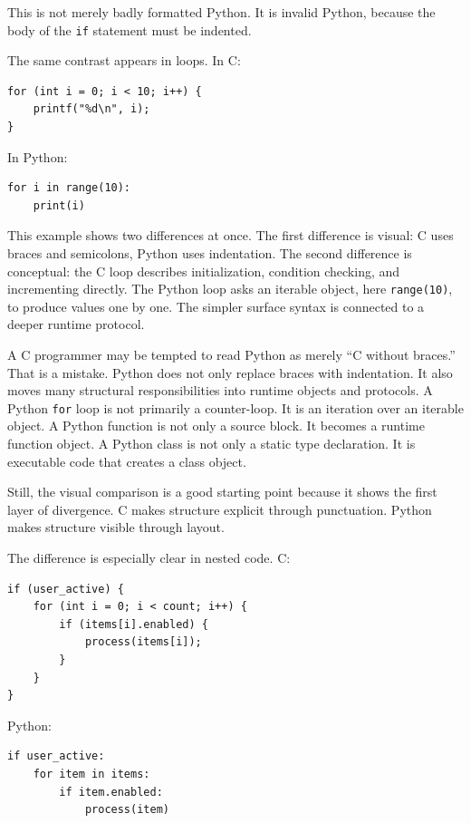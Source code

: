 This is not merely badly formatted Python. It is invalid Python, because the body of the \texttt{if} statement must be indented.

The same contrast appears in loops. In C:

\begin{verbatim}
for (int i = 0; i < 10; i++) {
    printf("%d\n", i);
}
\end{verbatim}

In Python:

\begin{verbatim}
for i in range(10):
    print(i)
\end{verbatim}

This example shows two differences at once. The first difference is visual: C uses braces and semicolons, Python uses indentation. The second difference is conceptual: the C loop describes initialization, condition checking, and incrementing directly. The Python loop asks an iterable object, here \texttt{range(10)}, to produce values one by one. The simpler surface syntax is connected to a deeper runtime protocol.

A C programmer may be tempted to read Python as merely ``C without braces.'' That is a mistake. Python does not only replace braces with indentation. It also moves many structural responsibilities into runtime objects and protocols. A Python \texttt{for} loop is not primarily a counter-loop. It is an iteration over an iterable object. A Python function is not only a source block. It becomes a runtime function object. A Python class is not only a static type declaration. It is executable code that creates a class object.

Still, the visual comparison is a good starting point because it shows the first layer of divergence. C makes structure explicit through punctuation. Python makes structure visible through layout.

The difference is especially clear in nested code. C:

\begin{verbatim}
if (user_active) {
    for (int i = 0; i < count; i++) {
        if (items[i].enabled) {
            process(items[i]);
        }
    }
}
\end{verbatim}

Python:

\begin{verbatim}
if user_active:
    for item in items:
        if item.enabled:
            process(item)
\end{verbatim}

